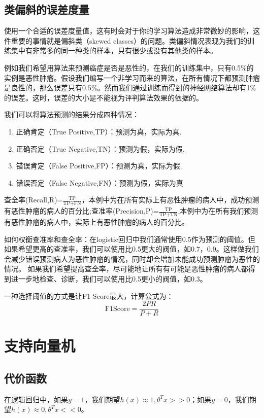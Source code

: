 \documentclass[cn,hazy,blue,normal,14pt]{elegantnote}
\begin{document}
\subsection{类偏斜的误差度量}
使用一个合适的误差度量值，这有时会对于你的学习算法造成非常微妙的影响，这件重要的事情就是偏斜类（skewed classes）的问题。类偏斜情况表现为我们的训练集中有非常多的同一种类的样本，只有很少或没有其他类的样本。

例如我们希望用算法来预测癌症是否是恶性的，在我们的训练集中，只有0.5\%的实例是恶性肿瘤。假设我们编写一个非学习而来的算法，在所有情况下都预测肿瘤是良性的，那么误差只有0.5\%。然而我们通过训练而得到的神经网络算法却有1\%的误差。这时，误差的大小是不能视为评判算法效果的依据的。 

我们可以将算法预测的结果分成四种情况：
\begin{enumerate}
    \item 正确肯定（True Positive,TP）：预测为真，实际为真.
    \item 正确否定（True Negative,TN）：预测为假，实际为假.
    \item 错误肯定（False Positive,FP）：预测为真，实际为假.
    \item 错误否定（False Negative,FN）：预测为假，实际为真
\end{enumerate}

\begin{definition}[查全率和查准率]
查全率(Recall,R)=$\frac{\text{TP}}{\text{TP+FN}}$，本例中为在所有实际上有恶性肿瘤的病人中，成功预测有恶性肿瘤的病人的百分比;查准率(Precision,P)=$\frac{\text{TP}}{\text{TP+TN}}$,本例中为在所有我们预测有恶性肿瘤的病人中，实际上有恶性肿瘤的病人的百分比。
\end{definition}

如何权衡查准率和查全率：在logistic回归中我们通常使用0.5作为预测的阈值。但如果希望更高的查准率，我们可以使用比0.5更大的阀值，如0.7，0.9。这样做我们会减少错误预测病人为恶性肿瘤的情况，同时却会增加未能成功预测肿瘤为恶性的情况。 如果我们希望提高查全率，尽可能地让所有有可能是恶性肿瘤的病人都得到进一步地检查、诊断，我们可以使用比0.5更小的阀值，如0.3。
\begin{note}
一种选择阈值的方式是让F1 Score最大，计算公式为：
$$
\text{F1Score}=\frac{2PR}{P+R}
$$
\end{note}
\section{支持向量机}
\subsection{代价函数}
在逻辑回归中，如果$y=1$，我们期望$h(x) \approx 1,\theta^T x>>0$；如果$y=0$，我们期望$h(x) \approx 0,\theta^T x<<0$。
\end{document}
